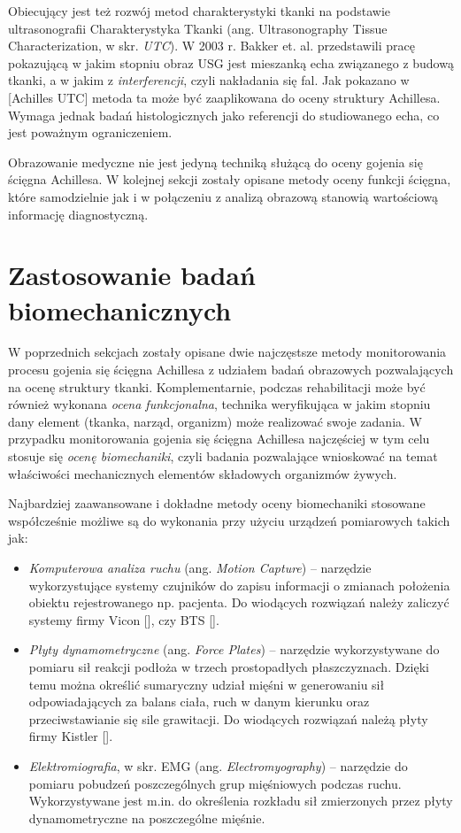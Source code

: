 Obiecujący jest też rozwój metod charakterystyki tkanki na podstawie ultrasonografii
Charakterystyka Tkanki (ang. Ultrasonography Tissue Characterization, w skr. \textit{UTC}). W 2003 r. Bakker et. al. przedstawili pracę pokazującą w jakim stopniu obraz USG jest mieszanką echa związanego z budową tkanki, a w jakim z \textit{interferencji}, czyli nakładania się fal. Jak pokazano w [Achilles UTC] metoda ta może być zaaplikowana do oceny struktury Achillesa. Wymaga jednak badań histologicznych jako referencji do studiowanego echa, co jest poważnym ograniczeniem. 

Obrazowanie medyczne nie jest jedyną techniką służącą do oceny gojenia się ścięgna Achillesa. W kolejnej sekcji zostały opisane metody oceny funkcji ścięgna, które samodzielnie jak i w połączeniu z analizą obrazową stanowią wartościową informację diagnostyczną.

\section{Zastosowanie badań biomechanicznych}

W poprzednich sekcjach zostały opisane dwie najczęstsze metody monitorowania procesu gojenia się ścięgna Achillesa z udziałem badań obrazowych pozwalających na ocenę struktury tkanki. Komplementarnie, podczas rehabilitacji może być również wykonana \textit{ocena funkcjonalna}, technika weryfikująca w jakim stopniu dany element (tkanka, narząd, organizm) może realizować swoje zadania. W przypadku monitorowania gojenia się ścięgna Achillesa najczęściej w tym celu stosuje się \textit{ocenę biomechaniki}, czyli badania pozwalające wnioskować na temat właściwości mechanicznych elementów składowych organizmów żywych. 

Najbardziej zaawansowane i dokładne metody oceny biomechaniki stosowane współcześnie możliwe są do wykonania przy użyciu urządzeń pomiarowych takich jak:
\begin{itemize}
	\item \textit{Komputerowa analiza ruchu} (ang. \textit{Motion Capture}) -- narzędzie wykorzystujące systemy czujników do zapisu informacji o zmianach położenia obiektu rejestrowanego np. pacjenta. Do wiodących rozwiązań należy zaliczyć systemy firmy Vicon [], czy BTS [].
	\item \textit{Płyty dynamometryczne} (ang. \textit{Force Plates}) -- narzędzie wykorzystywane do pomiaru sił reakcji podłoża w trzech prostopadłych płaszczyznach. Dzięki temu można określić sumaryczny udział mięśni w generowaniu sił odpowiadających za balans ciała, ruch w danym kierunku oraz przeciwstawianie się sile grawitacji. Do wiodących rozwiązań należą płyty firmy Kistler [].
	\item \textit{Elektromiografia}, w skr. EMG (ang. \textit{Electromyography}) -- narzędzie do pomiaru pobudzeń poszczególnych grup mięśniowych podczas ruchu. Wykorzystywane jest m.in. do określenia rozkładu sił zmierzonych przez płyty dynamometryczne na poszczególne mięśnie.
\end{itemize}

